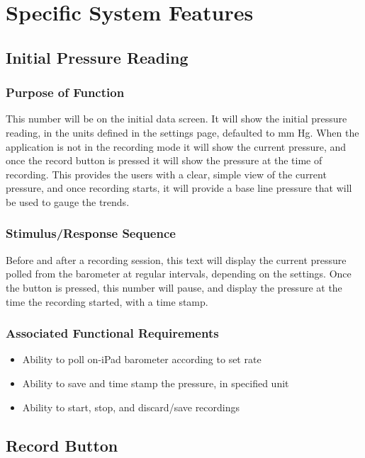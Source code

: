 \documentclass[onecolumn, draftclsnofoot,10pt, compsoc]{IEEEtran}
\begin{document}
\section{Specific System Features}

\subsection{Initial Pressure Reading}

\subsubsection{Purpose of Function}
This number will be on the initial data screen.
It will show the initial pressure reading, in the units defined in the settings page, defaulted to mm Hg.
When the application is not in the recording mode it will show the current pressure, and once the record button is pressed it will show the pressure at the time of recording.
This provides the users with a clear, simple view of the current pressure, and once recording starts, it will provide a base line pressure that will be used to gauge the trends.
\subsubsection{Stimulus/Response Sequence}
Before and after a recording session, this text will display the current pressure polled from the barometer at regular intervals, depending on the settings.
Once the button is pressed, this number will pause, and display the pressure at the time the recording started, with a time stamp.

\subsubsection{Associated Functional Requirements}
\begin{itemize}
\item Ability to poll on-iPad barometer according to set rate
\item Ability to save and time stamp the pressure, in specified unit
\item Ability to start, stop, and discard/save recordings
\end{itemize}

\subsection{Record Button}
\end{document}
